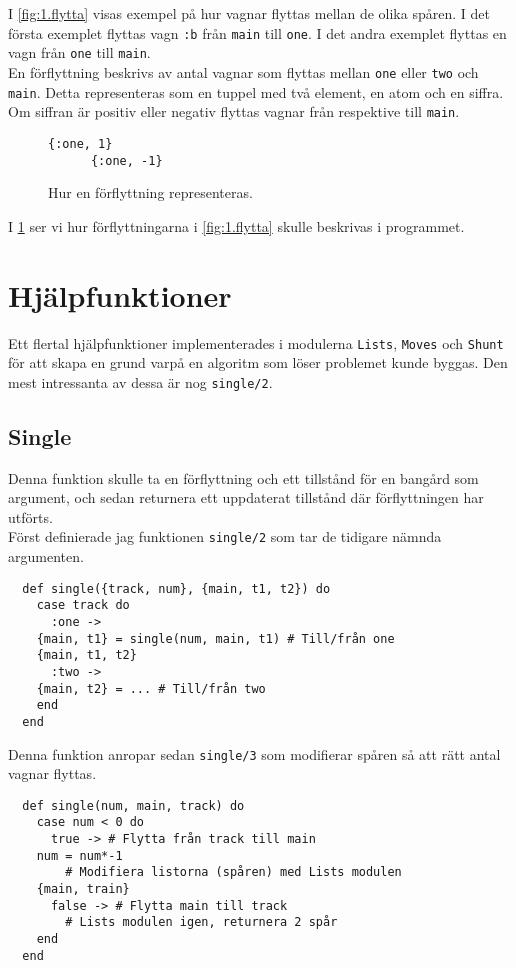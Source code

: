 \documentclass[a4paper,11pt]{article}
\begin{document}
I \ref{fig:1.flytta} visas exempel på hur vagnar flyttas mellan de olika spåren. I det första exemplet flyttas vagn {\tt :b} från {\tt main} till {\tt one}. I det andra exemplet flyttas en vagn från {\tt one} till {\tt main}.\\

En förflyttning beskrivs av antal vagnar som flyttas mellan {\tt one} eller {\tt two} och {\tt main}. Detta representeras som en tuppel med två element, en atom och en siffra. Om siffran är positiv eller negativ flyttas vagnar från respektive till {\tt main}.

\begin{figure}[H]
  \centering
    \begin{BVerbatim}[gobble=6]
      {:one, 1}
      {:one, -1}
    \end{BVerbatim}
  \caption{Hur en förflyttning representeras.}
  \label{fig:2.flytta}
\end{figure}

I \ref{fig:2.flytta} ser vi hur förflyttningarna i \ref{fig:1.flytta} skulle beskrivas i programmet.\\

\section*{Hjälpfunktioner}
Ett flertal hjälpfunktioner implementerades i modulerna {\tt Lists}, {\tt Moves} och {\tt Shunt} för att skapa en grund varpå en algoritm som löser problemet kunde byggas. Den mest intressanta av dessa är nog {\tt single/2}.
\subsection*{Single}
Denna funktion skulle ta en förflyttning och ett tillstånd för en bangård som argument, och sedan returnera ett uppdaterat tillstånd där förflyttningen har utförts.\\
Först definierade jag funktionen {\tt single/2} som tar de tidigare nämnda argumenten.
\begin{verbatim}
  def single({track, num}, {main, t1, t2}) do
    case track do
      :one ->	
	{main, t1} = single(num, main, t1) # Till/från one
	{main, t1, t2}
      :two ->
	{main, t2} = ... # Till/från two
    end
  end
\end{verbatim}

Denna funktion anropar sedan {\tt single/3} som modifierar spåren så att rätt antal vagnar flyttas.

\begin{verbatim}
  def single(num, main, track) do
    case num < 0 do
      true -> # Flytta från track till main
	num = num*-1 
        # Modifiera listorna (spåren) med Lists modulen
	{main, train}
      false -> # Flytta main till track
        # Lists modulen igen, returnera 2 spår
    end
  end
\end{verbatim}
\end{document}

